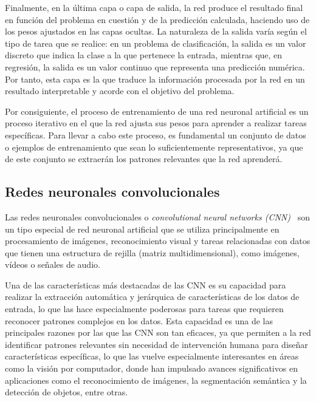 Finalmente, en la última capa o capa de salida, la red produce el resultado final en función del problema en cuestión y de la predicción calculada, haciendo uso de los pesos ajustados en las capas ocultas. La naturaleza de la salida varía según el tipo de tarea que se realice: en un problema de clasificación, la salida es un valor discreto que indica la clase a la que pertenece la entrada, mientras que, en regresión, la salida es un valor continuo que representa una predicción numérica. Por tanto, esta capa es la que traduce la información procesada por la red en un resultado interpretable y acorde con el objetivo del problema.

Por consiguiente, el proceso de entrenamiento de una red neuronal artificial es un proceso iterativo en el que la red ajusta sus pesos para aprender a realizar tareas específicas. Para llevar a cabo este proceso, es fundamental un conjunto de datos o ejemplos de entrenamiento que sean lo suficientemente representativos, ya que de este conjunto se extraerán los patrones relevantes que la red aprenderá.

\subsection{Redes neuronales convolucionales}\label{subsec:redes-neuronales-convolucionales}

Las redes neuronales convolucionales o \emph{convolutional neural networks (CNN)}~\cite{LeCun1989, LeCun1998} son un tipo especial de red neuronal artificial que se utiliza principalmente en procesamiento de imágenes, reconocimiento visual y tareas relacionadas con datos que tienen una estructura de rejilla (matriz multidimensional), como imágenes, vídeos o señales de audio.

Una de las características más destacadas de las CNN es su capacidad para realizar la extracción automática y jerárquica de características de los datos de entrada, lo que las hace especialmente poderosas para tareas que requieren reconocer patrones complejos en los datos. Esta capacidad es una de las principales razones por las que las CNN son tan eficaces, ya que permiten a la red identificar patrones relevantes sin necesidad de intervención humana para diseñar características específicas, lo que las vuelve especialmente interesantes en áreas como la visión por computador, donde han impulsado avances significativos en aplicaciones como el reconocimiento de imágenes, la segmentación semántica y la detección de objetos, entre otras.

